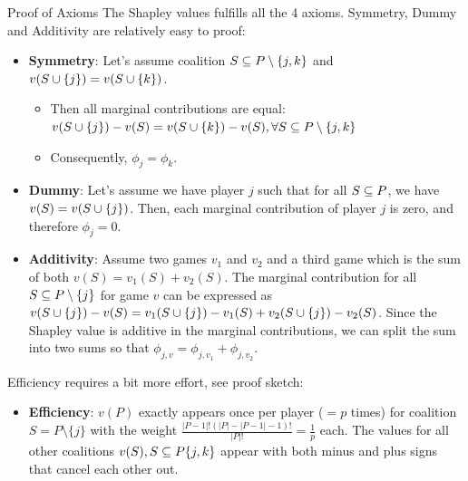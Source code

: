 \documentclass[11pt,compress,t,notes=noshow, xcolor=table]{beamer}
\begin{document}
\begin{vbframe}{Proof of Axioms}
  The Shapley values fulfills all the 4 axioms.
  Symmetry, Dummy and Additivity are relatively easy to proof:
\begin{itemize}
  \item \textbf{Symmetry}: Let's assume coalition $\SsubPnojk$ and $v(\Scupj) = v(\Scupk)$. 
    \begin{itemize}
        \item Then all marginal contributions are equal: $v(\Scupj) -  v(S) = v(\Scupk) -  v(S), \forall \SsubPnojk$
        \item Consequently, $\phi_j = \phi_k$.
    \end{itemize}
  \item \textbf{Dummy}: Let's assume we have player $j$ such that for all $\SsubP$, we have $v(S) = v(\Scupj)$. Then, each marginal contribution of player $j$ is zero, and therefore $\phi_j = 0$.
  \item \textbf{Additivity}:  Assume two games $v_1$ and $v_2$ and a third game which is the sum of both $v(S) = v_1(S) + v_2(S)$. The marginal contribution for all $\SsubPnoj$ for game $v$ can be expressed as $v(\Scupj) - v(S) = v_1(\Scupj) - v_1(S) + v_2(\Scupj) - v_2(S)$. Since the Shapley value is additive in the marginal contributions, we can split the sum into two sums so that $\phi_{j,v} = \phi_{j, v_1} + \phi_{j,v_2}$.
\end{itemize}
Efficiency requires a bit more effort, see proof sketch:
  \begin{itemize}
  \item \textbf{Efficiency}: $v(P)$ exactly appears once per player ($=p$ times) for coalition $S = P \setminus \{j\}$ with the weight $\frac{|P - 1|!(|P| - |P - 1| - 1)!}{|P|!} = \frac{1}{p}$ each. The values for all other coalitions $v(S), \SsubP \{j,k\}$ appear with both minus and plus signs that cancel each other out.
\end{itemize}
\end{vbframe}

\end{document}
